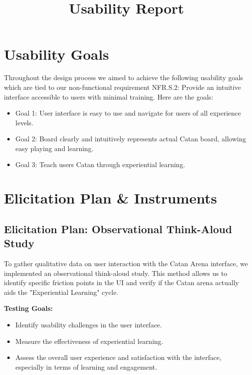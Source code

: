 \documentclass[12pt]{article}
\title{Usability Report}
\author{\authname}
\date{}
\begin{document}
\maketitle

\tableofcontents

\listoftables

\listoffigures

\newpage

\section{Usability Goals}
Throughout the design process we aimed to achieve the following usability goals which are tied to
our non-functional requirement NFR.S.2: Provide an intuitive interface accessible to users
with minimal training. Here are the goals:
\begin{itemize}
    \item Goal 1: User interface is easy to use and navigate for users of all experience levels.
    \item Goal 2: Board clearly and intuitively represents actual Catan board, allowing easy playing and learning.
    \item Goal 3: Teach users Catan through experiential learning.
\end{itemize}

\section{Elicitation Plan \& Instruments}
\subsection{Elicitation Plan: Observational Think-Aloud Study}
To gather qualitative data on user interaction with the Catan Arena interface, we implemented an observational think-aloud study.
This method allows us to identify specific friction points in the UI and verify if the Catan arena actually aids the "Experiential Learning" cycle.
\medskip   

\textbf{Testing Goals:}
\begin{itemize}
    \item Identify usability challenges in the user interface.
    \item Measure the effectiveness of experiential learning.
    \item Assess the overall user experience and satisfaction with the interface, especially in terms of learning and engagement.
\end{itemize}
\end{document}
